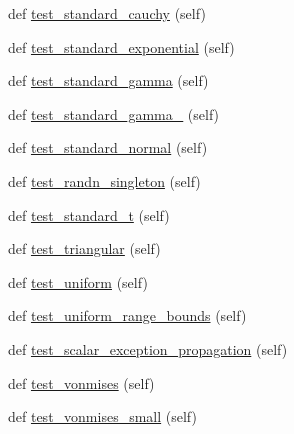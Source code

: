 \begin{DoxyCompactItemize}
\item 
def \hyperlink{classnumpy_1_1random_1_1tests_1_1test__randomstate_1_1TestRandomDist_a938420769c185dedc899666b5c796ba2}{test\+\_\+standard\+\_\+cauchy} (self)
\item 
def \hyperlink{classnumpy_1_1random_1_1tests_1_1test__randomstate_1_1TestRandomDist_aeb17e7e4ca15a72d6f04982d1994b934}{test\+\_\+standard\+\_\+exponential} (self)
\item 
def \hyperlink{classnumpy_1_1random_1_1tests_1_1test__randomstate_1_1TestRandomDist_a34d29582aa82a38cf8656cd616fab0cc}{test\+\_\+standard\+\_\+gamma} (self)
\item 
def \hyperlink{classnumpy_1_1random_1_1tests_1_1test__randomstate_1_1TestRandomDist_ad636cfeb6913bf93daae5296a54a56f8}{test\+\_\+standard\+\_\+gamma\+\_} (self)
\item 
def \hyperlink{classnumpy_1_1random_1_1tests_1_1test__randomstate_1_1TestRandomDist_a105e04de61e2e8ce3285b6badca0885b}{test\+\_\+standard\+\_\+normal} (self)
\item 
def \hyperlink{classnumpy_1_1random_1_1tests_1_1test__randomstate_1_1TestRandomDist_a5231cbe802f9c87181018bbe596ef47f}{test\+\_\+randn\+\_\+singleton} (self)
\item 
def \hyperlink{classnumpy_1_1random_1_1tests_1_1test__randomstate_1_1TestRandomDist_a67f7fbaee5a9a1666d121f71e1c476a5}{test\+\_\+standard\+\_\+t} (self)
\item 
def \hyperlink{classnumpy_1_1random_1_1tests_1_1test__randomstate_1_1TestRandomDist_a99722f1130575a9f45cccbc12588dc27}{test\+\_\+triangular} (self)
\item 
def \hyperlink{classnumpy_1_1random_1_1tests_1_1test__randomstate_1_1TestRandomDist_a5cbede13192ec24569906f10029f7f52}{test\+\_\+uniform} (self)
\item 
def \hyperlink{classnumpy_1_1random_1_1tests_1_1test__randomstate_1_1TestRandomDist_a604b9677f2b01592a90373691b63636a}{test\+\_\+uniform\+\_\+range\+\_\+bounds} (self)
\item 
def \hyperlink{classnumpy_1_1random_1_1tests_1_1test__randomstate_1_1TestRandomDist_a37b7bac42a0d460cff7b4a9b8ab7dd28}{test\+\_\+scalar\+\_\+exception\+\_\+propagation} (self)
\item 
def \hyperlink{classnumpy_1_1random_1_1tests_1_1test__randomstate_1_1TestRandomDist_a160ede03ba7774acc3a8fa035f02943d}{test\+\_\+vonmises} (self)
\item 
def \hyperlink{classnumpy_1_1random_1_1tests_1_1test__randomstate_1_1TestRandomDist_a130ceb992570e1fdb51388b48e4240f7}{test\+\_\+vonmises\+\_\+small} (self)

\end{DoxyCompactItemize}
